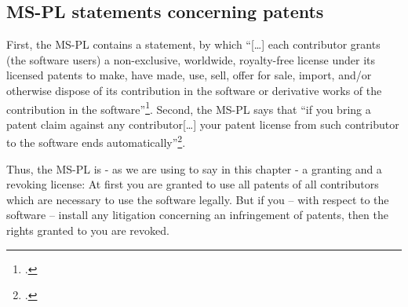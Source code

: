 \subsection{MS-PL statements concerning patents}\label{subsec:MsplPatentClause}

First, the MS-PL contains a statement, by which \enquote{[\ldots] each
contributor grants (the software users) a non-exclusive, worldwide, royalty-free
license under its licensed patents to make, have made, use, sell, offer for
sale, import, and/or otherwise dispose of its contribution in the software or
derivative works of the contribution in the software}\footcite[cf.][\nopage wp.
§2.B]{MsplOsiLicense2013a}. Second, the MS-PL says that \enquote{if you bring a
patent claim against any contributor[\ldots] your patent license from such
contributor to the software ends automatically}\footcite[cf.][\nopage wp.
§3.B]{MsplOsiLicense2013a}.

Thus, the MS-PL is - as we are using to say in this chapter - a granting and a
revoking license: At first you are granted to use all patents of all
contributors which are necessary to use the software legally. But if you -- with
respect to the software -- install any litigation concerning an infringement of
patents, then the rights granted to you are revoked.




% 
